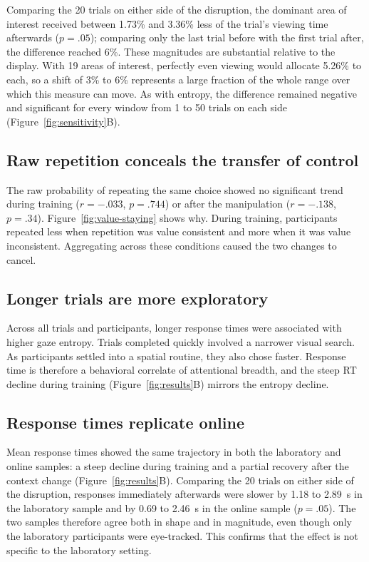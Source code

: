 \documentclass[man,natbib,floatsintext]{apa7}
\begin{document}
Comparing the 20 trials on either side of the disruption, the dominant area of interest received between 1.73\% and 3.36\% less of the trial's viewing time afterwards ($p=.05$); comparing only the last trial before with the first trial after, the difference reached 6\%. These magnitudes are substantial relative to the display. With 19 areas of interest, perfectly even viewing would allocate 5.26\% to each, so a shift of 3\% to 6\% represents a large fraction of the whole range over which this measure can move. As with entropy, the difference remained negative and significant for every window from 1 to 50 trials on each side (Figure~\ref{fig:sensitivity}B).

\subsection{Raw repetition conceals the transfer of control}

The raw probability of repeating the same choice showed no significant trend during training ($r=-.033$, $p=.744$) or after the manipulation ($r=-.138$, $p=.34$). Figure~\ref{fig:value-staying} shows why. During training, participants repeated less when repetition was value consistent and more when it was value inconsistent. Aggregating across these conditions caused the two changes to cancel.

\subsection{Longer trials are more exploratory}

Across all trials and participants, longer response times were associated with higher gaze entropy. Trials completed quickly involved a narrower visual search. As participants settled into a spatial routine, they also chose faster. Response time is therefore a behavioral correlate of attentional breadth, and the steep RT decline during training (Figure~\ref{fig:results}B) mirrors the entropy decline.

\subsection{Response times replicate online}

Mean response times showed the same trajectory in both the laboratory and online samples: a steep decline during training and a partial recovery after the context change (Figure~\ref{fig:results}B). Comparing the 20 trials on either side of the disruption, responses immediately afterwards were slower by 1.18 to 2.89~s in the laboratory sample and by 0.69 to 2.46~s in the online sample ($p=.05$). The two samples therefore agree both in shape and in magnitude, even though only the laboratory participants were eye-tracked. This confirms that the effect is not specific to the laboratory setting.
\end{document}
